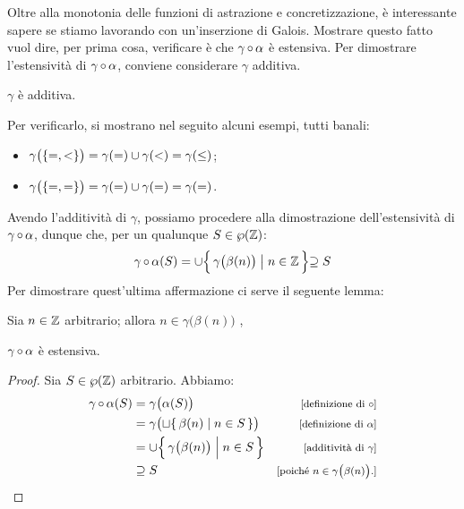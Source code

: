 Oltre alla monotonia delle funzioni di astrazione e concretizzazione,
è interessante sapere se stiamo lavorando con un'inserzione di Galois.
Mostrare questo fatto vuol dire, per prima cosa,
verificare è che $\mathrm{\gamma}\mathop{\circ}\mathrm{\alpha}$ è estensiva. 
Per dimostrare l'estensività di $\mathrm{\gamma}\mathop{\circ}\mathrm{\alpha}$, conviene
considerare $\gamma$ additiva.
\begin{proposizione}
$\gamma$ è additiva.
\end{proposizione}
Per verificarlo, si mostrano nel seguito alcuni esempi, tutti banali:
\begin{itemize}
  \item $\gamma\bigl(\{=, <\}\bigr) = \gamma(=) \cup \gamma(<) = \gamma(\leq)$;
  \item $\gamma\bigl(\{=, =\}\bigr) = \gamma(=) \cup \gamma(=) = \gamma(=)$.
\end{itemize}
Avendo l'additività di $\gamma$, possiamo procedere alla dimostrazione
dell'estensività di $\mathrm{\gamma}\mathop{\circ}\mathrm{\alpha}$, dunque che,
per un qualunque $S \in \wp(\mathbb{Z})$:
\[
  \mathrm{\gamma}\mathop{\circ}\mathrm{\alpha}(S) = \cup \Bigl\{\, \gamma\bigl(\beta(n)\bigr) \bigm| n \in \mathbb{Z} \,\Bigl\} \supseteq S
\]
Per dimostrare quest'ultima affermazione ci serve il seguente lemma:
\begin{lemma}
  Sia $n \in \mathbb{Z}$ arbitrario; allora
  $n \in \gamma\bigl(\beta(n)\bigr) $ ,
\end{lemma}

\begin{proposizione}
$\mathrm{\gamma}\mathop{\circ}\mathrm{\alpha}$ è estensiva.
\end{proposizione}
\begin{proof}
Sia $S \in \wp(\mathbb{Z})$ arbitrario.
Abbiamo:
\begin{align*}
  \compfun{\gamma}{\alpha}(S)
    &= \gamma\bigl(\alpha(S)\bigr)
    &\law{definizione di $\circ$} \\
    &= \gamma\bigl(\sqcup \{\, \beta(n) \mid n \in S \,\} \bigr)
    &\law{definizione di $\alpha$} \\
    &= \union \Bigl\{\, \gamma\bigl(\beta(n)\bigr) \Bigm| n \in S \,\Bigr\}
    &\law{additività di $\gamma$} \\
    &\supseteq S
    &\law{poiché $n \in \gamma\bigl(\beta(n)\bigr)$.}
\end{align*}
\end{proof}

